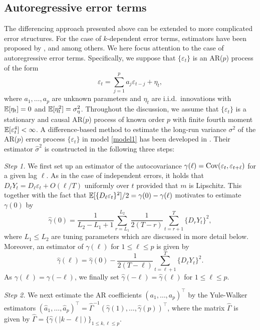 \subsection{Autoregressive error terms}


The differencing approach presented above can be extended to more complicated error structures. For the case of $k$-dependent error terms, estimators have been proposed by \cite{MuellerStadtmueller1988}, \cite{Herrmann1992} and \cite{Munk2017} among others. We here focus attention to the case of autoregressive error terms. Specifically, we suppose that $\{\varepsilon_t\}$ is an AR($p$) process of the form
\[ \varepsilon_t = \sum\limits_{j=1}^p a_j \varepsilon_{t-j} + \eta_t, \]
where $a_1,\ldots,a_p$ are unknown parameters and $\eta_t$ are i.i.d.\ innovations with $\mathbb{E}[\eta_t] = 0$ and $\mathbb{E}[\eta_t^2] = \sigma_\eta^2$. Throughout the discussion, we assume that $\{\varepsilon_t\}$ is a stationary and causal AR($p$) process of known order $p$ with finite fourth moment $\mathbb{E}[\varepsilon_t^4] < \infty$. A difference-based method to estimate the long-run variance $\sigma^2$ of the AR($p$) error process $\{\varepsilon_t\}$ in model \eqref{model1} has been developed in \cite{Hall2003}. Their estimator $\widehat{\sigma}^2$ is constructed in the following three steps: 
\vspace{10pt}


\textit{Step 1.} We first set up an estimator of the autocovariance $\gamma(\ell) = \textnormal{Cov}(\varepsilon_t,\varepsilon_{t+\ell})$ for a given lag $\ell$. As in the case of independent errors, it holds that $D_\ell Y_t = D_\ell \varepsilon_t + O(\ell/T)$ uniformly over $t$ provided that $m$ is Lipschitz. This together with the fact that $\mathbb{E}[ \{  D_\ell \varepsilon_t \}^2 ] / 2 = \gamma(0) - \gamma(\ell)$ motivates to estimate $\gamma(0)$ by 
\[ \widehat{\gamma}(0) = \frac{1}{L_2-L_1+1}\sum_{r=L_1}^{L_2}\frac{1}{2(T-r)}\sum_{t=r+1}^T\{D_rY_t\}^2, \]
where $L_1\le L_2$ are tuning parameters which are discussed in more detail below. Moreover, an estimator of $\gamma(\ell)$ for $1 \le \ell \le p$ is given by 
\[ \widehat{\gamma}(\ell) = \widehat{\gamma}(0) - \frac{1}{2(T-\ell)}\sum_{t=\ell+1}^T \{D_\ell Y_t\}^2. \]
As $\gamma(\ell) = \gamma(-\ell)$, we finally set $\widehat{\gamma}(-\ell) = \widehat{\gamma}(\ell)$ for $1 \le \ell \le p$. 
\vspace{10pt}

\textit{Step 2.} We next estimate the AR coefficients $(a_1,\ldots,a_p)^\top$ by the Yule-Walker estimators $(\widehat{a}_1,\ldots,\widehat{a}_p)^\top = \widehat{\Gamma}^{-1} (\widehat{\gamma}(1), \ldots, \widehat{\gamma}(p))^\top$, where the matrix $\widehat{\Gamma}$ is given by $\widehat{\Gamma} = \{ \widehat{\gamma}(|k-\ell|) \}_{1 \le k,\ell \le p}$. 
\vspace{10pt}


